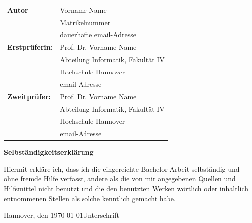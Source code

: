 \documentclass[12pt,DIV14,BCOR10mm,a4paper,twoside,parskip=half-,headsepline,headinclude]{scrreprt}
\begin{document}
  \newpage \thispagestyle{empty}
 \begin{tabular}{ll}
{\bfseries\sffamily Autor} &  Vorname Name \\ 
            & Matrikelnummer \\
            & dauerhafte email-Adresse \\[5ex]
{\bfseries\sffamily Erstprüferin:} & Prof. Dr. Vorname Name \\
          & Abteilung Informatik, Fakultät IV \\
         & Hochschule Hannover \\
        & email-Adresse \\[5ex]
{\bfseries\sffamily Zweitprüfer:} &Prof. Dr. Vorname Name \\
          & Abteilung Informatik, Fakultät IV \\
         & Hochschule Hannover \\
        & email-Adresse
\end{tabular}

\vfill

\begin{center} \sffamily\bfseries Selbständigkeitserklärung \end{center}

Hiermit erkläre ich, dass ich die eingereichte Bachelor-Arbeit
selbständig und ohne fremde Hilfe verfasst, andere als die von mir angegebenen Quellen
und Hilfsmittel nicht benutzt und die den benutzten Werken wörtlich oder
inhaltlich entnommenen Stellen als solche kenntlich gemacht habe. 
\vspace*{7ex}

Hannover, den \today \hfill Unterschrift
  \tableofcontents  %


\listoffigures      %

\listoftables       %

\blinddocument  %

%
%
%
%
%
%
%
\end{document}
